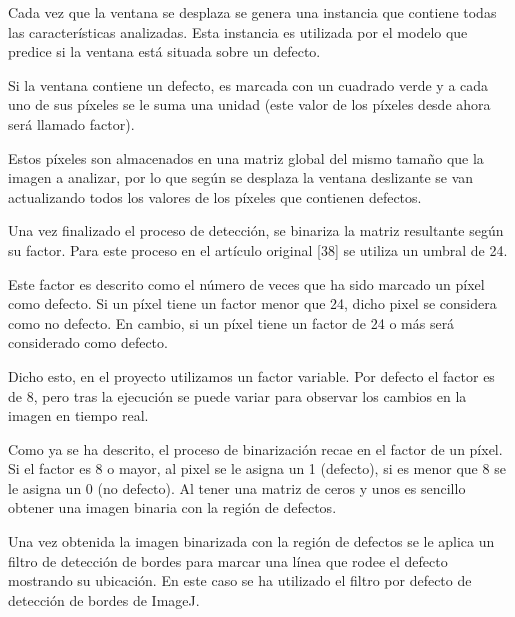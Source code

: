Cada vez que la ventana se desplaza se genera una instancia que contiene todas las características analizadas. Esta instancia es utilizada por el modelo que predice si la ventana está situada sobre un defecto.

Si la ventana contiene un defecto, es marcada con un cuadrado verde y a cada uno de sus píxeles se le suma una unidad (este valor de los píxeles desde ahora será llamado factor).

Estos píxeles son almacenados en una matriz global del mismo tamaño que la imagen a analizar, por lo que según se desplaza la ventana deslizante se van actualizando todos los valores de los píxeles que contienen defectos.

Una vez finalizado el proceso de detección, se binariza la matriz resultante según su factor. Para este proceso en el artículo original [38] se utiliza un umbral de 24.

Este factor es descrito como el número de veces que ha sido marcado un píxel como defecto. Si un píxel tiene un factor menor que 24, dicho pixel se considera como no defecto. En cambio, si un píxel tiene un factor de 24 o más será considerado como defecto.

Dicho esto, en el proyecto utilizamos un factor variable. Por defecto el factor es de 8, pero tras la ejecución se puede variar para observar los cambios en la imagen en tiempo real.

Como ya se ha descrito, el proceso de binarización recae en el factor de un píxel. Si el factor es 8 o mayor, al pixel se le asigna un 1 (defecto), si es menor que 8 se le asigna un 0 (no defecto). Al tener una matriz de ceros y unos es sencillo obtener una imagen binaria con la región de defectos.


Una vez obtenida la imagen binarizada con la región de defectos se le aplica un filtro de detección de bordes para marcar una línea que rodee el defecto mostrando su ubicación. En este caso se ha utilizado el filtro por defecto de detección de bordes de ImageJ.


